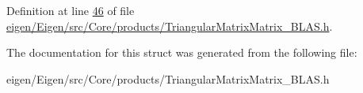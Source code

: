 Definition at line \hyperlink{eigen_2_eigen_2src_2_core_2products_2_triangular_matrix_matrix___b_l_a_s_8h_source_l00046}{46} of file \hyperlink{eigen_2_eigen_2src_2_core_2products_2_triangular_matrix_matrix___b_l_a_s_8h_source}{eigen/\+Eigen/src/\+Core/products/\+Triangular\+Matrix\+Matrix\+\_\+\+B\+L\+A\+S.\+h}.



The documentation for this struct was generated from the following file\+:\begin{DoxyCompactItemize}
\item 
eigen/\+Eigen/src/\+Core/products/\+Triangular\+Matrix\+Matrix\+\_\+\+B\+L\+A\+S.\+h\end{DoxyCompactItemize}
